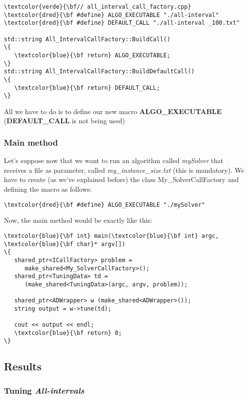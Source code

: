 \begin{Verbatim}[fontsize=\normalsize]
\textcolor{verde}{\bf// all_interval_call_factory.cpp}
\textcolor{dred}{\bf #define} ALGO_EXECUTABLE "./all-interval"
\textcolor{dred}{\bf #define} DEFAULT_CALL "./all-interval _100.txt"

std::string All_IntervalCallFactory::BuildCall()
\{
   \textcolor{blue}{\bf return} ALGO_EXECUTABLE;
\}
std::string All_IntervalCallFactory::BuildDefaultCall()
\{
   \textcolor{blue}{\bf return} DEFAULT_CALL;
\}
\end{Verbatim}

All we have to do is to define our new macro {\bf ALGO\_EXECUTABLE} ({\bf DEFAULT\_CALL} is not being used)

\subsubsection{Main method}

Let's suppose now that we want to run an algorithm called {\it mySolver} that receives a file as parameter, called {\it my\_instance\_size.txt} (this is mandatory). We have to create (as we've explained before) the class {\sc My\_SolverCallFactory} and defining the macro as follows:

\begin{Verbatim}[fontsize=\normalsize]
\textcolor{dred}{\bf #define} ALGO_EXECUTABLE "./mySolver"
\end{Verbatim}

Now, the main method would be exactly like this:

\begin{Verbatim}[fontsize=\normalsize]
\textcolor{blue}{\bf int} main(\textcolor{blue}{\bf int} argc, \textcolor{blue}{\bf char}* argv[])
\{
   shared_ptr<ICallFactory> problem = 
      make_shared<My_SolverCallFactory>();
   shared_ptr<TuningData> td = 
      (make_shared<TuningData>(argc, argv, problem));

   shared_ptr<ADWrapper> w (make_shared<ADWrapper>());
   string output = w->tune(td);

   cout << output << endl;
   \textcolor{blue}{\bf return} 0;
\}
\end{Verbatim}

\subsection{Results}

\subsubsection{ Tuning {\it All-intervals}}

